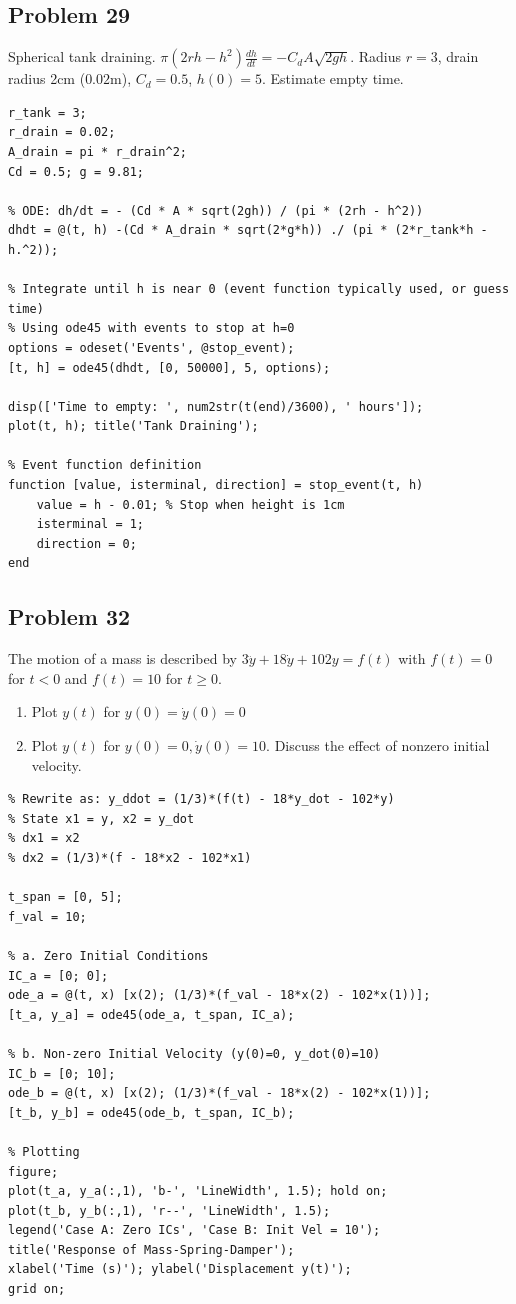 \documentclass[DIN, pagenumber=false, fontsize=11pt, parskip=half]{scrartcl}
\newcommand{\myproblem}[1]{\subsection*{#1}}
\begin{document}
\myproblem{Problem 29}
Spherical tank draining. $\pi(2rh-h^{2})\frac{dh}{dt}=-C_{d}A\sqrt{2gh}$.
Radius $r=3$, drain radius 2cm ($0.02$m), $C_d=0.5$, $h(0)=5$. Estimate empty time.

\begin{lstlisting}
r_tank = 3;
r_drain = 0.02;
A_drain = pi * r_drain^2;
Cd = 0.5; g = 9.81;

% ODE: dh/dt = - (Cd * A * sqrt(2gh)) / (pi * (2rh - h^2))
dhdt = @(t, h) -(Cd * A_drain * sqrt(2*g*h)) ./ (pi * (2*r_tank*h - h.^2));

% Integrate until h is near 0 (event function typically used, or guess time)
% Using ode45 with events to stop at h=0
options = odeset('Events', @stop_event);
[t, h] = ode45(dhdt, [0, 50000], 5, options);

disp(['Time to empty: ', num2str(t(end)/3600), ' hours']);
plot(t, h); title('Tank Draining');

% Event function definition
function [value, isterminal, direction] = stop_event(t, h)
    value = h - 0.01; % Stop when height is 1cm
    isterminal = 1;
    direction = 0;
end
\end{lstlisting}

\myproblem{Problem 32}
The motion of a mass is described by $3\ddot{y}+18\dot{y}+102y=f(t)$ with $f(t)=0$ for $t < 0$ and $f(t)=10$ for $t \ge 0$.
\begin{enumerate}
    \item[a.] Plot $y(t)$ for $y(0)=\dot{y}(0)=0$ 
        \item[b.] Plot $y(t)$ for $y(0)=0, \dot{y}(0)=10$. Discuss the effect of nonzero initial velocity.
\end{enumerate}

\begin{lstlisting}
% Rewrite as: y_ddot = (1/3)*(f(t) - 18*y_dot - 102*y)
% State x1 = y, x2 = y_dot
% dx1 = x2
% dx2 = (1/3)*(f - 18*x2 - 102*x1)

t_span = [0, 5];
f_val = 10; 

% a. Zero Initial Conditions
IC_a = [0; 0];
ode_a = @(t, x) [x(2); (1/3)*(f_val - 18*x(2) - 102*x(1))];
[t_a, y_a] = ode45(ode_a, t_span, IC_a);

% b. Non-zero Initial Velocity (y(0)=0, y_dot(0)=10)
IC_b = [0; 10];
ode_b = @(t, x) [x(2); (1/3)*(f_val - 18*x(2) - 102*x(1))];
[t_b, y_b] = ode45(ode_b, t_span, IC_b);

% Plotting
figure;
plot(t_a, y_a(:,1), 'b-', 'LineWidth', 1.5); hold on;
plot(t_b, y_b(:,1), 'r--', 'LineWidth', 1.5);
legend('Case A: Zero ICs', 'Case B: Init Vel = 10');
title('Response of Mass-Spring-Damper');
xlabel('Time (s)'); ylabel('Displacement y(t)');
grid on;
\end{lstlisting}
\end{document}
